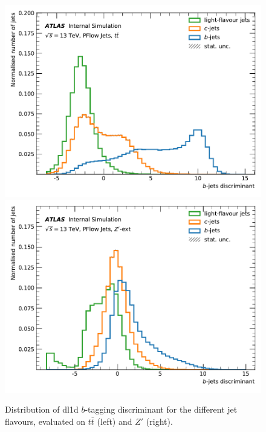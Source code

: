 %
\begin{center}
\begin{figure}[h!]
\centerline{
\includegraphics[scale=0.5]{Images//FTAG/Reprocessed/plotting_variables/scores_DL1_ttbar_300.pdf}
\includegraphics[scale=0.5]{Images//FTAG/Reprocessed/plotting_variables/scores_DL1_zprime_300.pdf}
}
\caption{Distribution of \gls{dl1d} $b$-tagging discriminant for the different jet flavours, evaluated on $t\bar{t}$ (left) and $Z'$ (right).}
\label{fig:scoreDL1dtt}
\centerline{
}
\end{figure}
\end{center}
